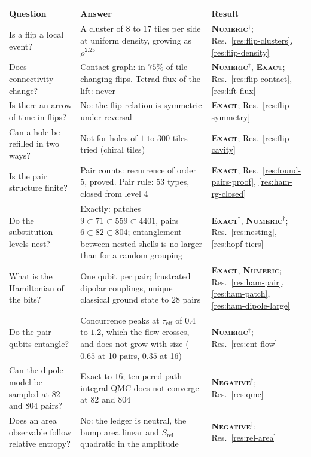 \documentclass[11pt]{article}
\newcommand{\exact}{\textbf{\textsc{Exact}}}
\newcommand{\numeric}{\textbf{\textsc{Numeric}}}
\newcommand{\negres}{\textbf{\textsc{Negative}}}
\theoremstyle{definition}
\begin{document}
\begin{table}[t]
\centering\footnotesize
\begin{tabular}{@{}p{58mm}p{50mm}p{20mm}@{}}
\toprule
Question & Answer & Result \\ \midrule
Is a flip a local event? & A cluster of $8$ to $17$ tiles per side at uniform density, growing as $\rho^{2.25}$ & \numeric$^\dagger$; Res.~\ref{res:flip-clusters}, \ref{res:flip-density} \\
Does connectivity change? & Contact graph: in $75\%$ of tile-changing flips. Tetrad flux of the lift: never & \numeric$^\dagger$, \exact; Res.~\ref{res:flip-contact}, \ref{res:lift-flux} \\
Is there an arrow of time in flips? & No: the flip relation is symmetric under reversal & \exact; Res.~\ref{res:flip-symmetry} \\
Can a hole be refilled in two ways? & Not for holes of $1$ to $300$ tiles tried (chiral tiles) & \exact; Res.~\ref{res:flip-cavity} \\
Is the pair structure finite? & Pair counts: recurrence of order $5$, proved. Pair rule: $53$ types, closed from level $4$ & \exact; Res.~\ref{res:found-pairs-proof}, \ref{res:ham-rg-closed} \\
Do the substitution levels nest? & Exactly: patches $9\subset71\subset559\subset4401$, pairs $6\subset82\subset804$; entanglement between nested shells is no larger than for a random grouping & \exact$^\dagger$, \numeric$^\dagger$; Res.~\ref{res:nesting}, \ref{res:hopf-tiers} \\
What is the Hamiltonian of the bits? & One qubit per pair; frustrated dipolar couplings, unique classical ground state to $28$ pairs & \exact, \numeric; Res.~\ref{res:ham-pair}, \ref{res:ham-patch}, \ref{res:ham-dipole-large} \\
Do the pair qubits entangle? & Concurrence peaks at $\tau_{\mathrm{eff}}$ of $0.4$ to $1.2$, which the flow crosses, and does not grow with size ($0.65$ at 10 pairs, $0.35$ at 16) & \numeric$^\dagger$; Res.~\ref{res:ent-flow} \\
Can the dipole model be sampled at $82$ and $804$ pairs? & Exact to $16$; tempered path-integral QMC does not converge at $82$ and $804$ & \negres$^\dagger$; Res.~\ref{res:qmc} \\
Does an area observable follow relative entropy? & No: the ledger is neutral, the bump area linear and $S_{\mathrm{rel}}$ quadratic in the amplitude & \negres$^\dagger$; Res.~\ref{res:rel-area} \\

\end{tabular}
\end{table}
\end{document}
